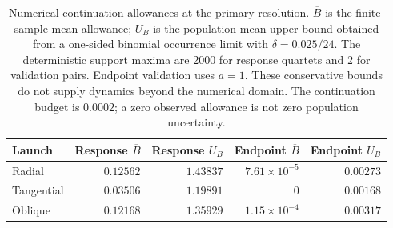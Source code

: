 \begin{table}[t]
\caption{Numerical-continuation allowances at the primary resolution. $\overline B$ is the finite-sample mean allowance; $U_B$ is the population-mean upper bound obtained from a one-sided binomial occurrence limit with $\delta=0.025/24$. The deterministic support maxima are 2000 for response quartets and 2 for validation pairs. Endpoint validation uses $a=1$. These conservative bounds do not supply dynamics beyond the numerical domain. The continuation budget is $0.0002$; a zero observed allowance is not zero population uncertainty.}\label{tab:response-continuation}
\centering\small
\begin{tabular}{lrrrr}
\toprule
Launch & Response $\overline B$ & Response $U_B$ & Endpoint $\overline B$ & Endpoint $U_B$ \\
\midrule
Radial & $0.12562$ & $1.43837$ & $7.61\times10^{-5}$ & $0.00273$ \\
Tangential & $0.03506$ & $1.19891$ & $0$ & $0.00168$ \\
Oblique & $0.12168$ & $1.35929$ & $1.15\times10^{-4}$ & $0.00317$ \\
\bottomrule
\end{tabular}
\end{table}
